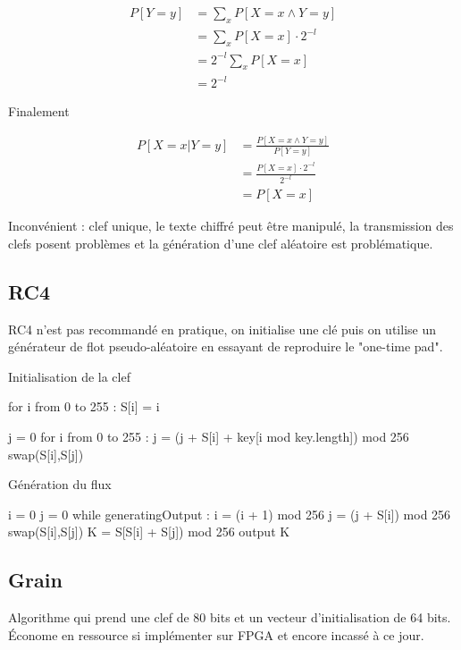 \documentclass[11pt,a4paper]{report}
\begin{document}
\begin{align*}
P[Y = y] &= \sum_x P[X=x \wedge Y = y] \\
         &= \sum_x P[X=x] \cdot 2^{-l} \\
         &= 2^{-l} \sum_x P[X=x]\\
         &= 2^{-l}
\end{align*}

Finalement

\begin{align*}
P[X=x | Y=y] &= \frac{P[X=x \wedge Y=y]}{P[Y=y]} \\
             &= \frac{P[X=x] \cdot 2^{-l}}{2^{-l}} \\
             &= P[X=x]
\end{align*}

Inconvénient : clef unique, le texte chiffré peut être manipulé, la transmission des clefs posent problèmes et la génération d'une clef aléatoire est problématique.

\subsection{RC4}

RC4 n'est pas recommandé en pratique, on initialise une clé puis on utilise un générateur de flot pseudo-aléatoire en essayant de reproduire le "one-time pad".
\begin{listing}[H]
\caption{Initialisation de la clef}
\begin{pythoncode}
for i from 0 to 255 :
    S[i] = i

j = 0
for i from 0 to 255 :
    j = (j + S[i] + key[i mod key.length]) mod 256
    swap(S[i],S[j])
\end{pythoncode}
\end{listing}

\begin{listing}[H]
\caption{Génération du flux}
\begin{pythoncode}
i = 0
j = 0
while generatingOutput :
    i = (i + 1) mod 256
    j = (j + S[i]) mod 256
    swap(S[i],S[j])
    K = S[S[i] + S[j]) mod 256
    output K
\end{pythoncode}
\end{listing}

\subsection{Grain}

Algorithme qui prend une clef de 80 bits et un vecteur d'initialisation de 64 bits. Économe en ressource si implémenter sur FPGA et encore incassé à ce jour.
\end{document}
